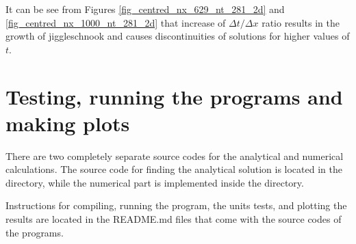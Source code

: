 It can be see from Figures \ref{fig_centred_nx_629_nt_281_2d} and \ref{fig_centred_nx_1000_nt_281_2d} that increase of $\Delta t / \Delta x$ ratio results in the growth of jiggleschnook and causes discontinuities of solutions for higher values of $t$.


\section{Testing, running the programs and making plots}

There are two completely separate source codes for the analytical and numerical calculations. The source code for finding the analytical solution is located in the  directory, while the numerical part is implemented inside the  directory.

Instructions for compiling, running the program, the units tests, and plotting the results are located in the README.md files that come with the source codes of the programs.